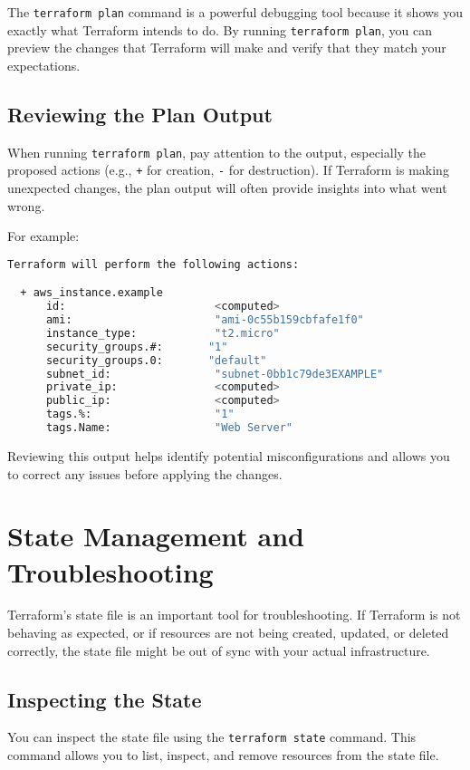 The \texttt{terraform plan} command is a powerful debugging tool because it shows you exactly what Terraform intends to do. By running \texttt{terraform plan}, you can preview the changes that Terraform will make and verify that they match your expectations.

\subsection{Reviewing the Plan Output}

When running \texttt{terraform plan}, pay attention to the output, especially the proposed actions (e.g., \texttt{+} for creation, \texttt{-} for destruction). If Terraform is making unexpected changes, the plan output will often provide insights into what went wrong.

For example:

\begin{lstlisting}[language=bash]
Terraform will perform the following actions:

  + aws_instance.example
      id:                       <computed>
      ami:                      "ami-0c55b159cbfafe1f0"
      instance_type:            "t2.micro"
      security_groups.#:       "1"
      security_groups.0:       "default"
      subnet_id:                "subnet-0bb1c79de3EXAMPLE"
      private_ip:               <computed>
      public_ip:                <computed>
      tags.%:                   "1"
      tags.Name:                "Web Server"
\end{lstlisting}

Reviewing this output helps identify potential misconfigurations and allows you to correct any issues before applying the changes.

\section{State Management and Troubleshooting}

Terraform's state file is an important tool for troubleshooting. If Terraform is not behaving as expected, or if resources are not being created, updated, or deleted correctly, the state file might be out of sync with your actual infrastructure.

\subsection{Inspecting the State}

You can inspect the state file using the \texttt{terraform state} command. This command allows you to list, inspect, and remove resources from the state file.

